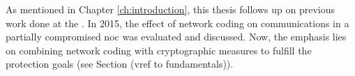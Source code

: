 As mentioned in Chapter \ref{ch:introduction}, this thesis follows up on previous work done at the \thechair. In 2015, the effect of network coding
on communications in a partially compromised \gls{noc} was evaluated and discussed. Now, the emphasis lies on combining network coding with
cryptographic measures to fulfill the protection goals (see Section (vref to fundamentals)). %
